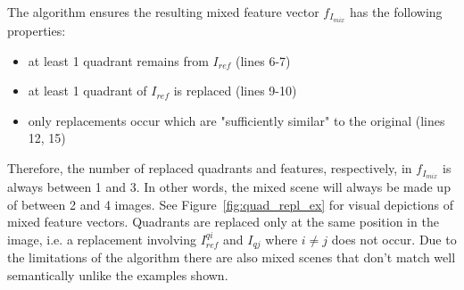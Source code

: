 \documentclass[12pt,a4paper]{article}
\begin{document}
The algorithm ensures the resulting mixed feature vector $f_{I_{mix}}$ has the following properties:
\begin{itemize}
   \item at least 1 quadrant remains from $I_{ref}$ (lines 6-7)
   \item at least 1 quadrant of $I_{ref}$ is replaced (lines 9-10)
   \item only replacements occur which are "sufficiently similar" to the original (lines 12, 15)
\end{itemize}
Therefore, the number of replaced quadrants and features, respectively, in $f_{I_{mix}}$ is always between 1 and 3. In other words, the mixed scene will always be made up of between 2 and 4 images. See Figure~\ref{fig:quad_repl_ex} for visual depictions of mixed feature vectors. Quadrants are replaced only at the same position in the image, i.e. a replacement involving $I^{qi}_{ref}$ and $I_{qj}$ where $i \neq j$ does not occur. Due to the limitations of the algorithm there are also mixed scenes that don't match well semantically unlike the examples shown.



\end{document}

